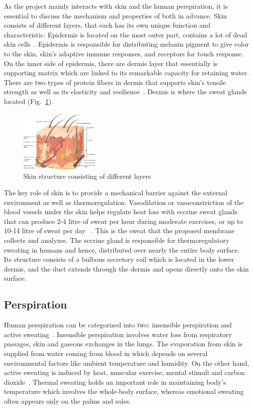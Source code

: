 \documentclass[journal]{IEEEtran}
\begin{document}
As the project mainly interacts with skin and the human perspiration, it is essential to discuss the mechanism and properties of both in advance. Skin consists of different layers, that each has its own unique function and characteristic. Epidermis is located on the most outer part, contains a lot of dead skin cells~\cite{PhysHumanPersp}. Epidermis is responsible for distributing melanin pigment to give color to the skin, skin’s adaptive immune responses, and receptors for touch response. On the inner side of epidermis, there are dermis layer that essentially is supporting matrix which are linked to its remarkable capacity for retaining water. There are two types of protein fibers in dermis that supports skin’s tensile strength as well as its elasticity and resilience~\cite{PhysHumanPersp}. Dermis is where the sweat glands located (Fig.~\ref{fig:skin}). 

\begin{figure}[H]
\centering
\includegraphics[width=0.35\textwidth]{images/skin.jpg}
\caption{Skin structure consisting of different layers}\label{fig:skin}
\end{figure}

The key role of skin is to provide a mechanical barrier against the external environment as well as thermoregulation. Vasodilation or vasoconstriction of the blood vessels under the skin helps regulate heat loss with eccrine sweat glands that can produce 2-4 litre of sweat per hour during moderate exercises, or up to 10-14 litre of sweat per day ~\cite{TemperatureRegulation, BodyFluid, Thermoregulatory}. This is the sweat that the proposed membrane collects and analyzes. The eccrine gland is responsible for thermoregulatory sweating in humans and hence, distributed over nearly the entire body surface. Its structure consists of a bulbous secretory coil which is located in the lower dermis, and the duct extends through the dermis and opens directly onto the skin surface.

\subsection{Perspiration}
 Human perspiration can be categorized into two: insensible perspiration and active sweating~\cite{PhysHumanPersp}. Insensible perspiration involves water loss from respiratory passages, skin and gaseous exchanges in the lungs. The evaporation from skin is supplied from water coming from blood in which depends on several environmental factors like ambient temperature and humidity. On the other hand, active sweating is induced by heat, muscular exercise, mental stimuli and carbon dioxide~\cite{PhysHumanPersp}. Thermal sweating holds an important role in maintaining body’s temperature which involves the whole-body surface, whereas emotional sweating often appears only on the palms and soles. 
\end{document}
